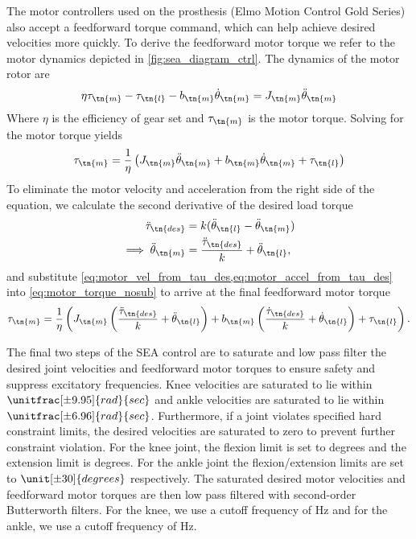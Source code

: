 The motor controllers used on the prosthesis (Elmo Motion Control Gold Series)
also accept a feedforward torque command, which can help achieve desired
velocities more quickly. To derive the feedforward motor torque we refer to the
motor dynamics depicted in \cref{fig:sea_diagram_ctrl}. The dynamics of the
motor rotor are
\begin{align}
    \eta \tau_\tn{m} - \tau_\tn{l} - b_\tn{m} \dot \theta_\tn{m} 
        = J_\tn{m} \ddot \theta_\tn{m}
\end{align}
Where $\eta$ is the efficiency of gear set and $\tau_\tn{m}$ is the motor
torque. Solving for the motor torque yields
\begin{align}
    \tau_\tn{m} = \frac{1}{\eta} \left( J_\tn{m} \ddot \theta_\tn{m} 
        + b_\tn{m} \dot \theta_\tn{m} + \tau_\tn{l} \right)
    \label{eq:motor_torque_nosub}
\end{align}
To eliminate the motor velocity and acceleration from the right side of the
equation, we calculate the second derivative of the desired load torque
\begin{align}
    \ddot \tau_\tn{des} &= k (\ddot \theta_\tn{l} - \ddot \theta_\tn{m}) \\
    \implies \ddot \theta_\tn{m} &= \frac{\ddot \tau_\tn{des}}{k} 
        + \ddot \theta_\tn{l},\label{eq:motor_accel_from_tau_des}
\end{align}
and substitute \cref{eq:motor_vel_from_tau_des,eq:motor_accel_from_tau_des} into
\cref{eq:motor_torque_nosub} to arrive at the final feedforward motor torque
\begin{align}
    \tau_\tn{m} = \frac{1}{\eta} \left( J_\tn{m} 
        \left( \frac{\ddot \tau_\tn{des}}{k} + \ddot \theta_\tn{l} \right)
        + b_\tn{m} \left(\frac{\dot \tau_\tn{des}}{k} + \dot \theta_\tn{l}\right)
        + \tau_\tn{l} \right).
\end{align}

The final two steps of the SEA control are to saturate and low pass filter the
desired joint velocities and feedforward motor torques to ensure safety and
suppress excitatory frequencies. Knee velocities are saturated to lie within
$\unitfrac[\pm 9.95]{rad}{sec}$ and ankle velocities are saturated to lie within
$\unitfrac[\pm 6.96]{rad}{sec}$. Furthermore, if a joint violates specified hard
constraint limits, the desired velocities are saturated to zero to prevent
further constraint violation. For the knee joint, the flexion limit is set to
\unit[90]{degrees} and the extension limit is \unit[-2]{degrees}. For the ankle
joint the flexion/extension limits are set to $\unit[\pm 30]{degrees}$
respectively. The saturated desired motor velocities and feedforward motor
torques are then low pass filtered with second-order Butterworth filters. For
the knee, we use a cutoff frequency of \unit[100]{Hz} and for the ankle, we use
a cutoff frequency of \unit[50]{Hz}.
